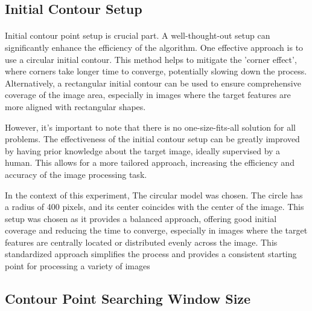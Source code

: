 \documentclass[12pt,a4paper]{report}
\begin{document}
\subsection{Initial Contour Setup}
\paragraph*{}
Initial contour point setup is crucial part. A well-thought-out setup can significantly enhance the efficiency of the algorithm. One effective approach is to use a circular initial contour. This method helps to mitigate the 'corner effect', where corners take longer time to converge, potentially slowing down the process. Alternatively, a rectangular initial contour can be used to ensure comprehensive coverage of the image area, especially in images where the target features are more aligned with rectangular shapes.

However, it's important to note that there is no one-size-fits-all solution for all problems. The effectiveness of the initial contour setup can be greatly improved by having prior knowledge about the target image, ideally supervised by a human. This allows for a more tailored approach, increasing the efficiency and accuracy of the image processing task.

In the context of this experiment, The circular model was chosen. The circle has a radius of 400 pixels, and its center coincides with the center of the image. This setup was chosen as it provides a balanced approach, offering good initial coverage and reducing the time to converge, especially in images where the target features are centrally located or distributed evenly across the image. This standardized approach simplifies the process and provides a consistent starting point for processing a variety of images

\subsection{Contour Point Searching Window Size}
\end{document}
